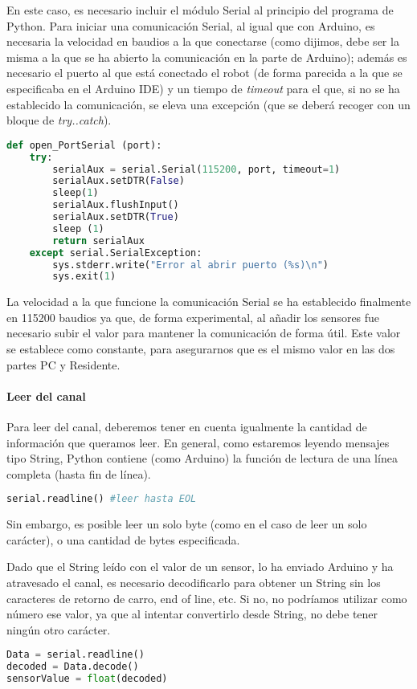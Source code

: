En este caso, es necesario incluir el módulo Serial al principio del programa de Python. Para iniciar una comunicación Serial, al igual que con Arduino, es necesaria la velocidad en baudios a la que conectarse (como dijimos, debe ser la misma a la que se ha abierto la comunicación en la parte de Arduino); además es necesario el puerto al que está conectado el robot (de forma parecida a la que se especificaba en el Arduino IDE) y un tiempo de \textit{timeout} para el que, si no se ha establecido la comunicación, se eleva una excepción (que se deberá recoger con un bloque de \textit{try..catch}). 
\begin{lstlisting}[language=python,caption={Función de la biblioteca Python para abrir el puerto serie},captionpos=b]	
def open_PortSerial (port):
	try:
		serialAux = serial.Serial(115200, port, timeout=1)
		serialAux.setDTR(False)
		sleep(1)
		serialAux.flushInput()
		serialAux.setDTR(True)
		sleep (1)
		return serialAux
	except serial.SerialException:
		sys.stderr.write("Error al abrir puerto (%s)\n")
		sys.exit(1)
\end{lstlisting}

La velocidad a la que funcione la comunicación Serial se ha establecido finalmente en 115200 baudios ya que, de forma experimental, al añadir los sensores fue necesario subir el valor para mantener la comunicación de forma útil. Este valor se establece como constante, para asegurarnos que es el mismo valor en las dos partes PC y Residente. 

\paragraph {Leer del canal} 
Para leer del canal, deberemos tener en cuenta igualmente la cantidad de información que queramos leer. En general, como estaremos leyendo mensajes tipo String, Python contiene (como Arduino) la función de lectura de una línea completa (hasta fin de línea). 
\begin{lstlisting}[language=python]
serial.readline() #leer hasta EOL		
\end{lstlisting}
Sin embargo, es posible leer un solo byte (como en el caso de leer un solo carácter), o una cantidad de bytes especificada.

Dado que el String leído con el valor de un sensor, lo ha enviado Arduino y ha atravesado el canal, es necesario decodificarlo para obtener un String sin los caracteres de retorno de carro, end of line, etc. Si no, no podríamos utilizar como número ese valor, ya que al intentar convertirlo desde String, no debe tener ningún otro carácter.
\begin{lstlisting}[language=python]	
Data = serial.readline()
decoded = Data.decode()
sensorValue = float(decoded)
\end{lstlisting}
	
